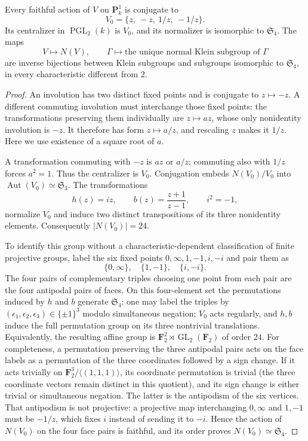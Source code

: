 \begin{proposition}\label{A5-normalizer}
Every faithful action of $V$ on $\mathbf P^1_k$ is conjugate to
\[
 V_0=\{z,\ -z,\ 1/z,\ -1/z\}.
\]
Its centralizer in $\operatorname{PGL}_2(k)$ is $V_0$, and its normalizer is isomorphic to $\mathfrak S_4$. The maps
\[
 V\longmapsto N(V),\qquad \Gamma\longmapsto
 \text{the unique normal Klein subgroup of }\Gamma
\]
are inverse bijections between Klein subgroups and subgroups isomorphic to $\mathfrak S_4$, in every characteristic different from $2$.
\end{proposition}
\begin{proof}
An involution has two distinct fixed points and is conjugate to $z\mapsto-z$. A different commuting involution must interchange those fixed points: the transformations preserving them individually are $z\mapsto az$, whose only nonidentity involution is $-z$. It therefore has form $z\mapsto a/z$, and rescaling $z$ makes it $1/z$. Here we use existence of a square root of $a$.

A transformation commuting with $-z$ is $az$ or $a/z$; commuting also with $1/z$ forces $a^2=1$. Thus the centralizer is $V_0$. Conjugation embeds $N(V_0)/V_0$ into $\operatorname{Aut}(V_0)\simeq\mathfrak S_3$. The transformations
\[
 h(z)=iz,\qquad b(z)=\frac{z+1}{z-1},\qquad i^2=-1,
\]
normalize $V_0$ and induce two distinct transpositions of its three nonidentity elements. Consequently $|N(V_0)|=24$.

To identify this group without a characteristic-dependent classification of finite projective groups, label the six fixed points $0,\infty,1,-1,i,-i$ and pair them as
\[
 \{0,\infty\},\quad\{1,-1\},\quad\{i,-i\}.
\]
The four pairs of complementary triples choosing one point from each pair are the four antipodal pairs of faces. On this four-element set the permutations induced by $h$ and $b$ generate $\mathfrak S_4$: one may label the triples by $(\epsilon_1,\epsilon_2,\epsilon_3)\in\{\pm1\}^3$ modulo simultaneous negation; $V_0$ acts regularly, and $h,b$ induce the full permutation group on its three nontrivial translations. Equivalently, the resulting affine group is $\mathbf F_2^2\rtimes\operatorname{GL}_2(\mathbf F_2)$ of order $24$. For completeness, a permutation preserving the three antipodal pairs acts on the face labels as a permutation of the three coordinates followed by a sign change. If it acts trivially on $\mathbf F_2^3/\langle(1,1,1)\rangle$, its coordinate permutation is trivial (the three coordinate vectors remain distinct in this quotient), and its sign change is either trivial or simultaneous negation. The latter is the antipodism of the six vertices. That antipodism is not projective: a projective map interchanging $0,\infty$ and $1,-1$ must be $-1/z$, which fixes $i$ instead of sending it to $-i$. Hence the action of $N(V_0)$ on the four face pairs is faithful, and its order proves $N(V_0)\simeq\mathfrak S_4$.


\end{proof}
